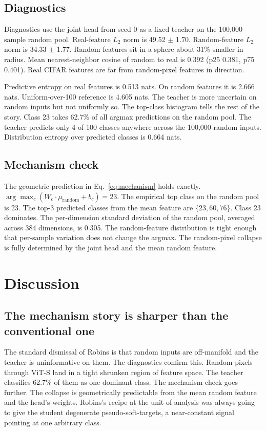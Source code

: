\documentclass[conference]{IEEEtran}
\begin{document}
\subsection{Diagnostics}

Diagnostics use the joint head from seed 0 as a fixed teacher on the
100{,}000-sample random pool. Real-feature $L_2$ norm is
49.52 $\pm$ 1.70. Random-feature $L_2$ norm is 34.33 $\pm$ 1.77.
Random features sit in a sphere about 31\% smaller in radius. Mean
nearest-neighbor cosine of random to real is 0.392
(p25 0.381, p75 0.401). Real CIFAR features are far from random-pixel
features in direction.

Predictive entropy on real features is 0.513 nats. On random features it
is 2.666 nats. Uniform-over-100 reference is 4.605 nats. The teacher is
more uncertain on random inputs but not uniformly so. The top-class
histogram tells the rest of the story. Class 23 takes 62.7\% of all argmax
predictions on the random pool. The teacher predicts only 4 of 100 classes
anywhere across the 100{,}000 random inputs. Distribution entropy over
predicted classes is 0.664 nats.

\subsection{Mechanism check}

The geometric prediction in Eq.~\ref{eq:mechanism} holds exactly.
$\arg\max_c (W_c \cdot \mu_{\text{random}} + b_c) = 23$. The empirical top
class on the random pool is 23. The top-3 predicted classes from the mean
feature are $\{23, 60, 76\}$. Class 23 dominates. The per-dimension
standard deviation of the random pool, averaged across 384 dimensions, is
0.305. The random-feature distribution is tight enough that per-sample
variation does not change the argmax. The random-pixel collapse is fully
determined by the joint head and the mean random feature.

\section{Discussion}\label{sec:discussion}

\subsection{The mechanism story is sharper than the conventional one}

The standard dismissal of Robins is that random inputs are off-manifold and
the teacher is uninformative on them. The diagnostics confirm this. Random
pixels through ViT-S land in a tight shrunken region of feature space. The
teacher classifies 62.7\% of them as one dominant class. The mechanism
check goes further. The collapse is geometrically predictable from the
mean random feature and the head's weights. Robins's recipe at the unit of
analysis was always going to give the student degenerate pseudo-soft-targets,
a near-constant signal pointing at one arbitrary class.
\end{document}
